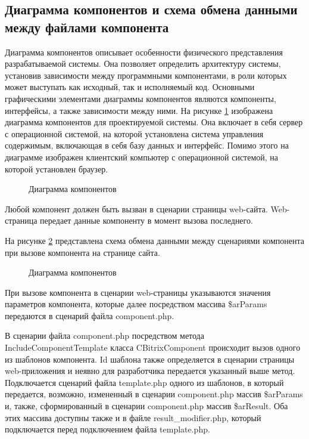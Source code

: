 \subsection{Диаграмма компонентов и схема обмена данными между файлами компонента}

Диаграмма компонентов описывает особенности физического представления разрабатываемой системы. Она позволяет определить архитектуру системы, установив зависимости между программными компонентами, в роли которых может выступать как исходный, так и исполняемый код. Основными графическими элементами диаграммы компонентов являются компоненты, интерфейсы, а также зависимости между ними. На рисунке \ref{comp:image} изображена диаграмма компонентов для проектируемой системы. Она включает в себя сервер с операционной системой, на которой установлена система управления содержимым, включающая в себя базу данных и интерфейс. Помимо этого на диаграмме изображен клиентский компьютер с операционной системой, на которой установлен браузер.

\begin{figure}[ht]
\caption{Диаграмма компонентов}
\label{comp:image}
\end{figure}

Любой компонент должен быть вызван в сценарии страницы web-сайта. Web-страница передает данные компоненту в момент вызова последнего.

На рисунке \ref{data:image} представлена схема обмена данными между сценариями компонента при вызове компонента на странице сайта.

\begin{figure}[ht]
\caption{Диаграмма компонентов}
\label{data:image}
\end{figure}

При вызове компонента в сценарии web-страницы указываются значения параметров компонента, которые далее посредством массива \$arParams передаются в сценарий файла component.php.

В сценарии файла component.php посредством метода \linebreak IncludeComponentTemplate класса CBitrixComponent происходит вызов одного из шаблонов компонента. Id шаблона также определяется в сценарии страницы web-приложения и неявно для разработчика передается указанный выше метод. Подключается сценарий файла template.php одного из шаблонов, в который передается, возможно, измененный в сценарии component.php массив \$arParams и, также, сформированный в сценарии component.php массив \$arResult. Оба этих массива доступны также и в файле result\_modifier.php, который подключается перед подключением файла template.php. 

